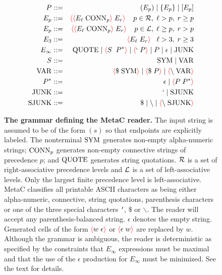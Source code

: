 \documentclass{article}
\newcommand{\fopen}{{\color{red} \langle}}
\newcommand{\fclose}{{\color{red} \rangle}}
\begin{document}
\begin{figure}
  
\begin{eqnarray*}
  P & ::= & (E_p) \;|\; \{E_p\} \;|\; [E_p] \\
  E_p & ::= & \fopen \fopen E_\ell\;\conn_p\fclose \;E_r\fclose\;\;\;\;p \in {\cal R}, \;\ell > p, \; r \geq p \\
  E_p & ::= & \fopen \fopen E_\ell\;\conn_p\fclose \;E_r\fclose\;\;\;\;p \in {\cal L}, \; \ell \geq p,\; r > p \\
  E_3 & ::= & \fopen E_\ell \;E_r\fclose \;\;\;\ell > 3,\;r \geq 3\\
  E_\infty & ::= & \quot \;|\; \fopen S \; \;P^* \fclose \;|\; \fopen `\;P\fclose \;|\; P \;|\; \epsilon \;|\; \mathrm{JUNK}\\
  S & ::= & \;\sym \;|\; \var \\
  \var & ::= & \fopen \$\;\sym\fclose \;|\; \fopen \$\;P\fclose \;|\; \fopen \backslash \; \var \fclose\\
  P^* & ::= &  \epsilon  \;|\; \fopen P\;P^* \fclose \\
  \mathrm{JUNK} & ::= & ` \;|\; \mathrm{SJUNK} \\
  \mathrm{SJUNK} & :: = & \$ \;|\;  \backslash \;|\; \fopen \backslash\;\mathrm{SJUNK} \fclose\\
\end{eqnarray*}

\caption{{\bf The grammar defining the MetaC reader.} The input string is assumed to be of the form $(s)$ so that endpoints are explicitly labeled.
The nonterminal $\mathrm{SYM}$ generates non-empty alpha-numeric strings; $\mathrm{CONN}_p$ generates non-empty connective
strings of precedence $p$; and $\mathrm{QUOTE}$ generates string quotations.  ${\cal R}$ is a set of right-associative precedence levels and ${\cal L}$ is a set of left-associative levels.
Only the largest finite precedence level is left-associative. MetaC classifies all printable ASCII characters as being either alpha-numeric, connective, string quotations, parenthesis characters or one of the three special characters
{\tt `}, $\$$ or $\backslash$.
The reader will accept any parenthesis-balanced string. $\epsilon$ denotes the empty string. Generated cells of the form $\fopen w\;\epsilon \fclose$ or $\fopen \epsilon \;w\fclose$ are replaced by $w$.
Although the grammar is ambiguous, the reader is deterministic as specified by the constraints that
$E_\infty$ expressions must be maximal and that the use of the $\epsilon$ production for $E_\infty$ must be minimized.  See the text for details.
  }
\label{fig:grammar}
\end{figure}
\end{document}

